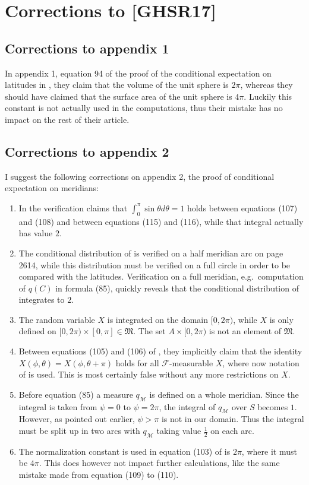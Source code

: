 \documentclass[a4paper]{report}
\theoremstyle{plain}
\theoremstyle{definition}
\theoremstyle{remark}
\numberwithin{equation}{chapter}
\DeclareMathOperator{\1}{\mathbbm{1}}
\newcommand{\F}{\mathcal{F}}
\begin{document}



\appendix
\chapter{Corrections to [GHSR17]}
\section{Corrections to appendix 1}\label{app:CorLong}
In appendix 1, equation 94 of the proof of the conditional expectation on latitudes in \cite{Gyenis17}, they claim that the volume of the unit sphere is $2\pi$, whereas they should have claimed that the surface area of the unit sphere is $4\pi$. Luckily this constant is not actually used in the computations, thus their mistake has no impact on the rest of their article.

\section{Corrections to appendix 2}\label{app:CorMer}
I suggest the following corrections on appendix 2, the proof of conditional expectation on meridians:
\begin{enumerate}
\item In the verification \cite{Gyenis17} claims that $\int_0^\pi\sin\theta d\theta=1$ holds between equations (107) and (108) and between equations (115) and (116), while that integral actually has value $2$.
\item The conditional distribution of \cite{Gyenis17} is verified on a half meridian arc on page 2614, while this distribution must be verified on a full circle in order to be compared with the latitudes. Verification on a full meridian, e.g.~computation of $q(C)$ in formula (85), quickly reveals that the conditional distribution of \cite{Gyenis17} integrates to $2$.
\item The random variable $X$ is integrated on the domain $[0,2\pi)$, while $X$ is only defined on $[0,2\pi)\times[0,\pi]\in\mathfrak{M}$. The set $A\times[0,2\pi)$ is not an element of $\mathfrak{M}$.
\item Between equations (105) and (106) of \cite{Gyenis17}, they implicitly claim that the identity $X(\phi,\theta)=X(\phi,\theta+\pi)$ holds for all $\F$-measurable $X$, where now notation of \cite{Gyenis17} is used. This is most certainly false without any more restrictions on $X$.
\item Before equation (85) a measure $q_\mathcal{M}$ is defined on a whole meridian. Since the integral is taken from $\psi=0$ to $\psi=2\pi$, the integral of $q_\mathcal{M}$ over $S$ becomes $1$. However, as pointed out earlier, $\psi>\pi$ is not in our domain. Thus the integral must be split up in two arcs with $q_{\mathcal{M}}$ taking value $\frac{1}{2}$ on each arc.
\item The normalization constant is used in equation (103) of \cite{Gyenis17} is $2\pi$, where it must be $4\pi$. This does however not impact further calculations, like the same mistake made from equation (109) to (110).
\end{enumerate}
\end{document}
